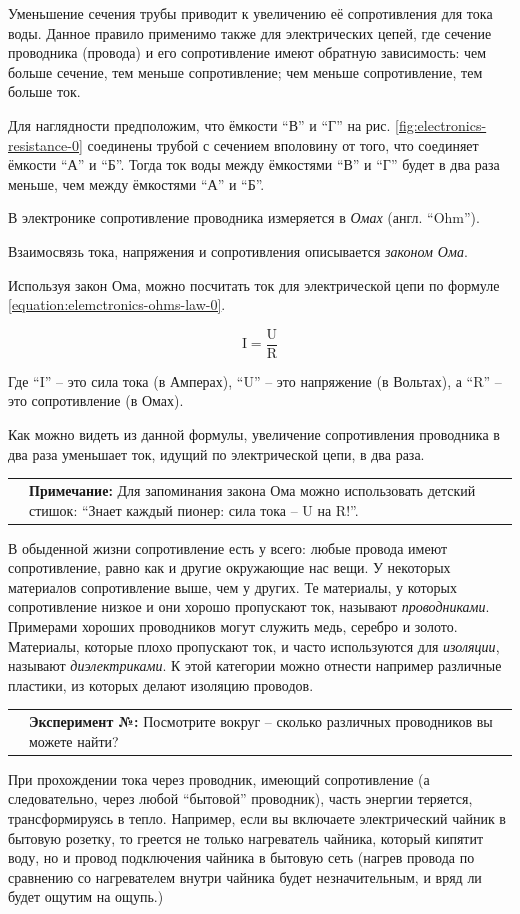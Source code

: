 \documentclass[a4paper,twoside]{book}
\newcounter{experiment-counter}
\newcommand{\experiment}[2]{
  \vspace{8pt}
  \begin{tabularx}{\textwidth}{m{1cm} m{9cm}}
    
    & \textbf{Эксперимент №\arabic{experiment-counter}:} #2 \\
  \end{tabularx}
  \addtocounter{experiment-counter}{1}
}
\newcommand{\note}[1]{
  \vspace{8pt}
  \begin{tabularx}{\textwidth}{m{1cm} m{9cm}}
    
    & \textbf{Примечание:} #1 \\
  \end{tabularx}
}
\begin{document}
Уменьшение сечения трубы приводит к увеличению её сопротивления для тока воды.
Данное правило применимо также для электрических цепей, где сечение проводника
(провода) и его сопротивление имеют обратную зависимость: чем больше сечение,
тем меньше сопротивление; чем меньше сопротивление, тем больше ток.

Для наглядности предположим, что ёмкости ``В'' и ``Г'' на
рис. \ref{fig:electronics-resistance-0} соединены трубой с сечением вполовину от
того, что соединяет ёмкости ``А'' и ``Б''.  Тогда ток воды между ёмкостями ``В''
и ``Г'' будет в два раза меньше, чем между ёмкостями ``А'' и ``Б''.

В электронике сопротивление проводника измеряется в \emph{Омах} (англ. ``Ohm'').

Взаимосвязь тока, напряжения и сопротивления описывается \emph{законом Ома}.

Используя закон Ома, можно посчитать ток для электрической цепи по формуле
\ref{equation:elemctronics-ohms-law-0}.

\begin{equation}
  \mbox{I} = \frac{\mbox{U}}{\mbox{R}}
  \label{equation:elemctronics-ohms-law-0}
\end{equation}

Где ``I'' -- это сила тока (в Амперах), ``U'' -- это напряжение (в Вольтах), а
``R'' -- это сопротивление (в Омах).

Как можно видеть из данной формулы, увеличение сопротивления проводника в два
раза уменьшает ток, идущий по электрической цепи, в два раза.

\note{ Для запоминания закона Ома можно использовать детский стишок: ``Знает
  каждый пионер: сила тока -- U на R!''.  }

В обыденной жизни сопротивление есть у всего: любые провода имеют сопротивление,
равно как и другие окружающие нас вещи.  У некоторых материалов сопротивление
выше, чем у других.  Те материалы, у которых сопротивление низкое и они хорошо
пропускают ток, называют \emph{проводниками}.  Примерами хороших проводников
могут служить медь, серебро и золото.  Материалы, которые плохо пропускают ток,
и часто используются для \emph{изоляции}, называют \emph{диэлектриками}.  К этой
категории можно отнести например различные пластики, из которых делают изоляцию
проводов.

\experiment{0}{Посмотрите вокруг -- сколько различных проводников вы можете
  найти?}

При прохождении тока через проводник, имеющий сопротивление (а следовательно,
через любой ``бытовой'' проводник), часть энергии теряется, трансформируясь в
тепло.  Например, если вы включаете электрический чайник в бытовую розетку, то
греется не только нагреватель чайника, который кипятит воду, но и провод
подключения чайника в бытовую сеть (нагрев провода по сравнению со нагревателем
внутри чайника будет незначительным, и вряд ли будет ощутим на ощупь.)
\end{document}
